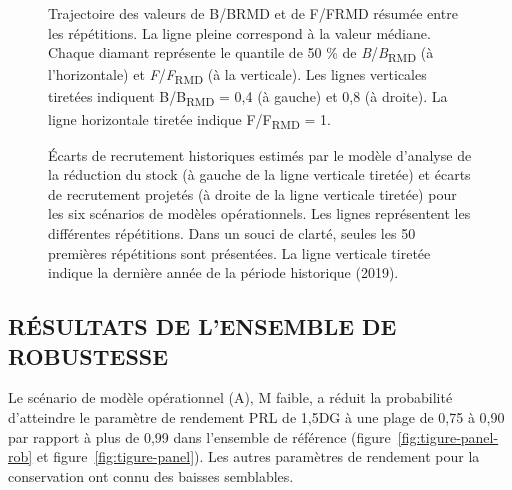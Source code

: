 \documentclass[11pt]{book}
\begin{document}
\begin{figure}[htb]

{\centering {} 

}

\caption{Trajectoire des valeurs de B/BRMD et de F/FRMD résumée entre les répétitions. La ligne pleine correspond à la valeur médiane. Chaque diamant représente le quantile de 50 \% de \emph{B}/\emph{B}\textsubscript{RMD} (à l'horizontale) et \emph{F}/\emph{F}\textsubscript{RMD} (à la verticale). Les lignes verticales tiretées indiquent B/B\textsubscript{RMD} = 0,4 (à gauche) et 0,8 (à droite). La ligne horizontale tiretée indique F/F\textsubscript{RMD} = 1.}\label{fig:worm}
\end{figure}
\clearpage


\begin{figure}[htb]

{\centering {} 

}

\caption{Écarts de recrutement historiques estimés par le modèle d'analyse de la réduction du stock (à gauche de la ligne verticale tiretée) et écarts de recrutement projetés (à droite de la ligne verticale tiretée) pour les six scénarios de modèles opérationnels. Les lignes représentent les différentes répétitions. Dans un souci de clarté, seules les 50 premières répétitions sont présentées. La ligne verticale tiretée indique la dernière année de la période historique (2019).}\label{fig:recdev-om-proj}
\end{figure}
\clearpage

\clearpage

\hypertarget{ruxe9sultats-de-lensemble-de-robustesse}{%
\subsection{RÉSULTATS DE L'ENSEMBLE DE ROBUSTESSE}\label{ruxe9sultats-de-lensemble-de-robustesse}}

Le scénario de modèle opérationnel (A), M faible, a réduit la probabilité d'atteindre le paramètre de rendement PRL de 1,5DG à une plage de 0,75 à 0,90 par rapport à plus de 0,99 dans l'ensemble de référence (figure~\ref{fig:tigure-panel-rob} et figure~\ref{fig:tigure-panel}). Les autres paramètres de rendement pour la conservation ont connu des baisses semblables.
\end{document}
